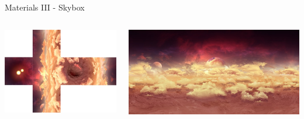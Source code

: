 \documentclass[xcolor=table]{beamer}
\begin{document}
\begin{frame}{Materials III - Skybox}
\centering
\begin{columns}[T] %
	\begin{column}{.48\textwidth}
		\includegraphics[scale=0.30]{media/cubemap-cross.jpg}
	\end{column}%
	\hfill%
	\begin{column}{.48\textwidth}
		\includegraphics[scale=0.20]{media/skybox-assembled.jpg}
	\end{column}%
\end{columns}

\end{frame}
\end{document}
